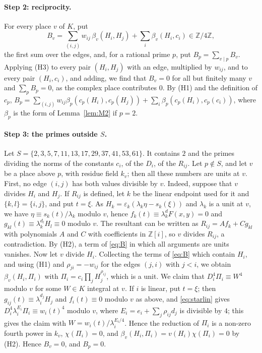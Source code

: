 \documentclass[11pt]{article}
\newcommand{\Z}{\mathbb{Z}}
\begin{document}
\paragraph{Step 2: reciprocity.} For every place $v$ of $K$, put
\begin{equation}\label{eq:B}
B_v=\sum_{(i,j)}w_{ij}\,\beta_v(H_i,H_j)+\sum_i\beta_v(H_i,c_i)\in\Z/4\Z,
\end{equation}
the first sum over the edges, and, for a rational prime $p$, put $B_p=\sum_{v\mid p}B_v$. Applying (H3) to every pair $(H_i,H_j)$ with an edge, multiplied by $w_{ij}$, and to every pair $(H_i,c_i)$, and adding, we find that $B_v=0$ for all but finitely many $v$ and $\sum_pB_p=0$, as the complex place contributes $0$. By (H1) and the definition of $c_p$, $B_p=\sum_{(i,j)}w_{ij}\beta_p(c_p(H_i),c_p(H_j))+\sum_i\beta_p(c_p(H_i),c_p(c_i))$, where $\beta_p$ is the form of Lemma~\ref{lem:M2} if $p=2$.

\paragraph{Step 3: the primes outside $S$.} Let $S=\{2,3,5,7,11,13,17,29,37,41,53,61\}$. It contains $2$ and the primes dividing the norms of the constants $c_i$, of the $D_i$, of the $R_{ij}$. Let $p\notin S$, and let $v$ be a place above $p$, with residue field $k_v$; then all these numbers are units at $v$. First, no edge $(i,j)$ has both values divisible by $v$. Indeed, suppose that $v$ divides $H_i$ and $H_j$. If $R_{ij}$ is defined, let $k$ be the linear endpoint used for it and $\{k,l\}=\{i,j\}$, and put $t=\xi$. As $H_k=\varepsilon_k(\lambda_k\eta-s_k(\xi))$ and $\lambda_k$ is a unit at $v$, we have $\eta\equiv s_k(t)/\lambda_k$ modulo $v$, hence $f_k(t)\equiv\lambda_k^dF(x,y)=0$ and $g_{kl}(t)\equiv\lambda_k^{d_l}H_l\equiv0$ modulo $v$. The resultant can be written as $R_{ij}=Af_k+Cg_{kl}$ with polynomials $A$ and $C$ with coefficients in $\Z[i]$, so $v$ divides $R_{ij}$, a contradiction. By (H2), a term of \eqref{eq:B} in which all arguments are units vanishes. Now let $v$ divide $H_i$. Collecting the terms of \eqref{eq:B} which contain $H_i$, and using (H1) and $\rho_{ji}=-w_{ij}$ for the edges $(j,i)$ with $j<i$, we obtain $\beta_v(H_i,\Pi_i)$ with $\Pi_i=c_i\prod_jH_j^{\rho_{ij}}$, which is a unit. We claim that $D_i^4\Pi_i\equiv W^4$ modulo $v$ for some $W\in K$ integral at $v$. If $i$ is linear, put $t=\xi$; then $g_{ij}(t)\equiv\lambda_i^{d_j}H_j$ and $f_i(t)\equiv0$ modulo $v$ as above, and \eqref{eq:starlin} gives $D_i^4\lambda_i^{E_i}\Pi_i\equiv w_i(t)^4$ modulo $v$, where $E_i=e_i+\sum_j\rho_{ij}d_j$ is divisible by $4$; this gives the claim with $W=w_i(t)/\lambda_i^{E_i/4}$. Hence the reduction of $\Pi_i$ is a non-zero fourth power in $k_v$, $\chi(\Pi_i)=0$, and $\beta_v(H_i,\Pi_i)=v(H_i)\chi(\Pi_i)=0$ by (H2). Hence $B_v=0$, and $B_p=0$.
\end{document}
